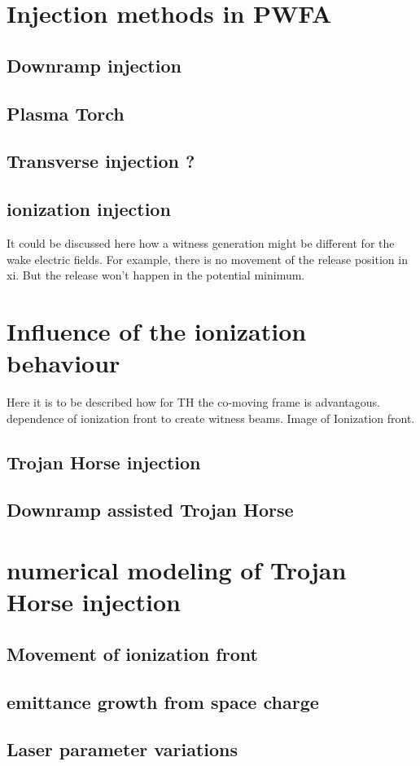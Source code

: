 \section{Injection methods in PWFA}
\subsection{Downramp injection}
\subsection{Plasma Torch}
\subsection{Transverse injection ?}
\subsection{ionization injection}
	It could be discussed here how a witness generation might be different for the wake electric fields.
	For example, there is no movement of the release position in xi. But the release won't happen in the potential minimum.
	
\section{Influence of the ionization behaviour}
	Here it is to be described how for TH the co-moving frame is advantagous. dependence of ionization front to 
	create witness beams.
	Image of Ionization front.
	
	

\subsection{Trojan Horse injection}
\label{sec:Theory_TrojanHorse}
	
\subsection{Downramp assisted Trojan Horse}

\section{numerical modeling of Trojan Horse injection}

\subsection{Movement of ionization front}
\subsection{emittance growth from space charge}
\subsection{Laser parameter variations}
	
